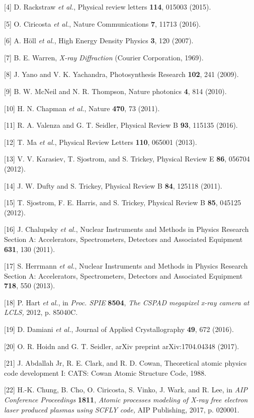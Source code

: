 {[}4{]} D. Rackstraw \emph{et al.}, Physical review letters
\textbf{114}, 015003 (2015).

{[}5{]} O. Ciricosta \emph{et al.}, Nature Communications \textbf{7},
11713 (2016).

{[}6{]} A. Höll \emph{et al.}, High Energy Density Physics \textbf{3},
120 (2007).

{[}7{]} B. E. Warren, \emph{X-ray Diffraction} (Courier Corporation,
1969).

{[}8{]} J. Yano and V. K. Yachandra, Photosynthesis Research
\textbf{102}, 241 (2009).

{[}9{]} B. W. McNeil and N. R. Thompson, Nature photonics \textbf{4},
814 (2010).

{[}10{]} H. N. Chapman \emph{et al.}, Nature \textbf{470}, 73 (2011).

{[}11{]} R. A. Valenza and G. T. Seidler, Physical Review B \textbf{93},
115135 (2016).

{[}12{]} T. Ma \emph{et al.}, Physical Review Letters \textbf{110},
065001 (2013).

{[}13{]} V. V. Karasiev, T. Sjostrom, and S. Trickey, Physical Review E
\textbf{86}, 056704 (2012).

{[}14{]} J. W. Dufty and S. Trickey, Physical Review B \textbf{84},
125118 (2011).

{[}15{]} T. Sjostrom, F. E. Harris, and S. Trickey, Physical Review B
\textbf{85}, 045125 (2012).

{[}16{]} J. Chalupsky \emph{et al.}, Nuclear Instruments and Methods in
Physics Research Section A: Accelerators, Spectrometers, Detectors and
Associated Equipment \textbf{631}, 130 (2011).

{[}17{]} S. Herrmann \emph{et al.}, Nuclear Instruments and Methods in
Physics Research Section A: Accelerators, Spectrometers, Detectors and
Associated Equipment \textbf{718}, 550 (2013).

{[}18{]} P. Hart \emph{et al.}, in \emph{Proc. SPIE} \textbf{8504},
\emph{The CSPAD megapixel x-ray camera at LCLS,} 2012, p. 85040C.

{[}19{]} D. Damiani \emph{et al.}, Journal of Applied Crystallography
\textbf{49}, 672 (2016).

{[}20{]} O. R. Hoidn and G. T. Seidler, arXiv preprint arXiv:1704.04348
(2017).

{[}21{]} J. Abdallah Jr, R. E. Clark, and R. D. Cowan, Theoretical
atomic physics code development I: CATS: Cowan Atomic Structure Code,
1988.

{[}22{]} H.-K. Chung, B. Cho, O. Ciricosta, S. Vinko, J. Wark, and R.
Lee, in \emph{AIP Conference Proceedings} \textbf{1811}, \emph{Atomic
processes modeling of X-ray free electron laser produced plasmas using
SCFLY code,} AIP Publishing, 2017, p. 020001.

